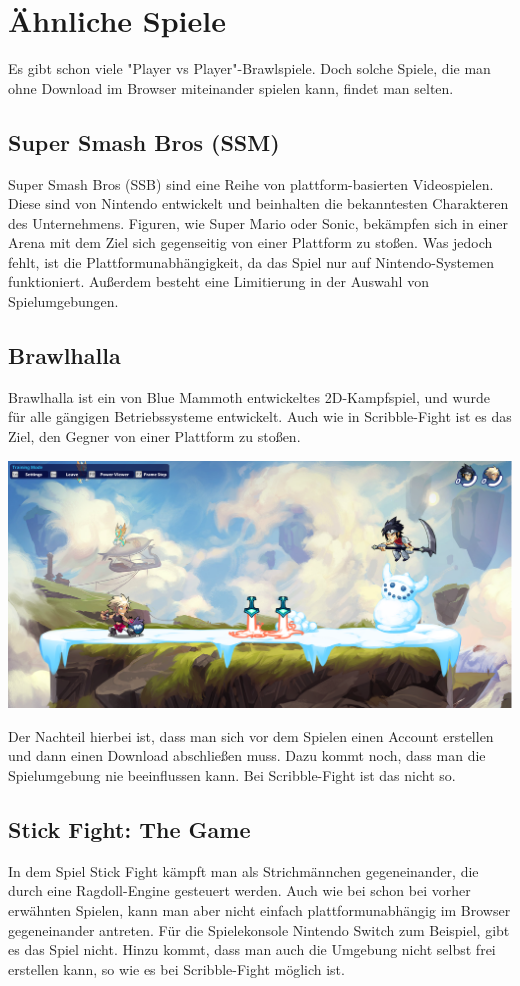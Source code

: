 \section{Ähnliche Spiele}
Es gibt schon viele "Player vs Player"-Brawlspiele. Doch solche Spiele, die man ohne Download im Browser
miteinander spielen kann, findet man selten. 

\subsection{Super Smash Bros (SSM)}
Super Smash Bros (SSB) sind eine Reihe von plattform-basierten Videospielen.
Diese sind von Nintendo entwickelt und beinhalten die bekanntesten Charakteren des Unternehmens.
Figuren, wie Super Mario oder Sonic, bekämpfen sich in einer Arena mit dem Ziel sich gegenseitig 
von einer Plattform zu stoßen.
Was jedoch fehlt, ist die Plattformunabhängigkeit, da das Spiel nur auf Nintendo-Systemen funktioniert.
Außerdem besteht eine Limitierung in der Auswahl von Spielumgebungen.

\subsection{Brawlhalla}
Brawlhalla ist ein von Blue Mammoth entwickeltes 2D-Kampfspiel, und wurde für alle gängigen Betriebssysteme entwickelt. 
Auch wie in Scribble-Fight ist es das Ziel, den Gegner von einer Plattform zu stoßen.

\includegraphics[scale=0.3]{pics/brawlhalla.PNG}

Der Nachteil hierbei ist, dass man sich vor dem Spielen einen Account erstellen
und dann einen Download abschließen muss. Dazu kommt noch, dass man die Spielumgebung nie beeinflussen kann.
Bei Scribble-Fight ist das nicht so. 

\subsection{Stick Fight: The Game}
In dem Spiel Stick Fight kämpft man als Strichmännchen gegeneinander, die durch eine Ragdoll-Engine gesteuert werden.
Auch wie bei schon bei vorher erwähnten Spielen, kann man aber nicht einfach plattformunabhängig im Browser gegeneinander antreten.
Für die Spielekonsole Nintendo Switch zum Beispiel, gibt es das Spiel nicht. Hinzu kommt, dass man auch die Umgebung nicht selbst frei erstellen kann, so wie es bei Scribble-Fight möglich ist.

